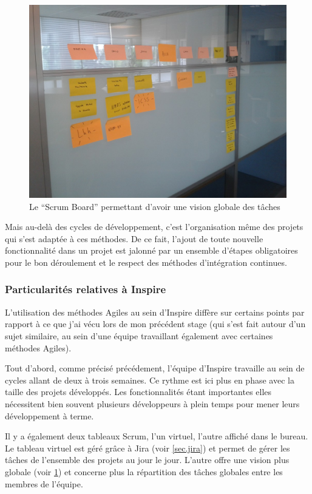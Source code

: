 \documentclass[12pt,a4paper]{book}
\begin{document}
\begin{figure}[htp]
\centering
\includegraphics[scale=.40]{img/agile1.jpg}
 \caption{Le ``Scrum Board'' permettant d'avoir une vision globale des tâches}
 \label{fig.agile1}
\end{figure}

Mais au-delà des cycles de développement, c'est l'organisation même des projets qui s'est adaptée à ces méthodes. De ce fait, l'ajout de toute nouvelle fonctionnalité dans un projet est jalonné par un ensemble d'étapes obligatoires pour le bon déroulement et le respect des méthodes d'intégration continues.

\subsubsection{Particularités relatives à Inspire}

L'utilisation des méthodes Agiles au sein d'Inspire diffère sur certains points par rapport à ce que j'ai vécu lors de mon précédent stage (qui s'est fait autour d'un sujet similaire, au sein d'une équipe travaillant également avec certaines méthodes Agiles).

Tout d'abord, comme précisé précédement, l'équipe d'Inspire travaille au sein de cycles allant de deux à trois semaines. Ce rythme est ici plus en phase avec la taille des projets développés. Les fonctionnalités étant importantes elles nécessitent bien souvent plusieurs développeurs à plein temps pour mener leurs développement à terme. 

Il y a également deux tableaux Scrum, l'un virtuel, l'autre affiché dans le bureau. Le tableau virtuel est géré grâce à Jira (voir \cref{sec.jira}) et permet de gérer les tâches de l'ensemble des projets au jour le jour. L'autre offre une vision plus globale (voir \cref{fig.agile1}) et concerne plus la répartition des tâches globales entre les membres de l'équipe.
\end{document}

